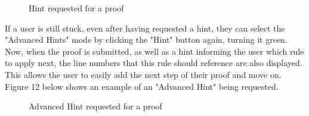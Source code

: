 \begin{figure}[!ht]
	\centering
	\caption{Hint requested for a proof}
\end{figure}

If a user is still stuck, even after having requested a hint, they can select the "Advanced Hints" mode by clicking the "Hint" button again, turning it green. Now, when the proof is submitted, as well as a hint informing the user which rule to apply next, the line numbers that this rule should reference are also displayed. This allows the user to easily add the next step of their proof and move on. Figure 12 below shows an example of an "Advanced Hint" being requested.

\begin{figure}[!ht]
	\centering
	\caption{Advanced Hint requested for a proof}
\end{figure}

